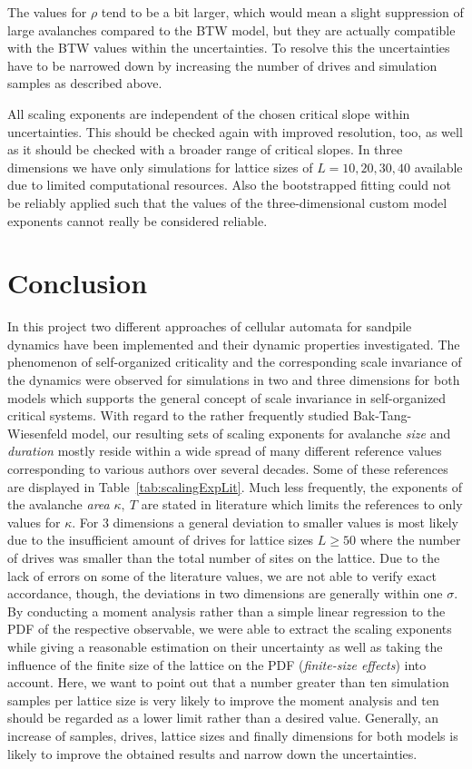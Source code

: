 The values for $\rho$ tend to be a bit larger, which would mean a slight suppression of large avalanches compared to
the BTW model, but they are actually compatible with the BTW values within the uncertainties. To resolve this the
uncertainties have to be narrowed down by increasing the number of drives and simulation samples as described above.

All scaling exponents are independent of the chosen critical slope within uncertainties. This should be checked again
with improved resolution, too, as well as it should be checked with a broader range of critical slopes.
In three dimensions we have only simulations for lattice sizes of $L=10,20,30,40$ available due to limited computational
resources. Also the bootstrapped fitting could not be reliably applied such that the values of the three-dimensional
custom model exponents cannot really be considered reliable.


\section{Conclusion}
\label{sec:conclusion}

In this project two different approaches of cellular automata for sandpile dynamics have been implemented and their
dynamic properties investigated. The phenomenon of self-organized criticality and the corresponding scale invariance
of the dynamics were observed for simulations in two and three dimensions for both models which supports the general
concept of scale invariance in self-organized critical systems. With regard to the rather frequently studied
Bak-Tang-Wiesenfeld model, our resulting sets of scaling exponents for avalanche \textit{size} and \textit{duration}
mostly reside within a wide spread of many different reference values corresponding to various authors over several
decades. Some of these references are displayed in Table~\ref{tab:scalingExpLit}. Much less frequently, the exponents of the
avalanche \textit{area} $\kappa,\ T$ are stated in literature which limits the references to only values for $\kappa$.
For 3 dimensions a general deviation to smaller values is most likely due to the insufficient amount of drives for
lattice sizes $L\ge 50$ where the number of drives was smaller than the total number of sites on the lattice.
Due to the lack of errors on some of the literature values, we are not able to verify exact accordance, though,
the deviations in two dimensions are generally within one $\sigma$. By conducting a moment analysis rather than a
simple linear regression to the PDF of the respective observable, we were able to extract the scaling exponents while
giving a reasonable estimation on their uncertainty as well as taking the influence of the finite size of the lattice
on the PDF (\textit{finite-size effects}) into account. Here, we want to point out that a number greater than ten
simulation samples per lattice size is very likely to improve the moment analysis and ten should be regarded as a lower
limit rather than a desired value. Generally, an increase of samples, drives, lattice sizes and finally dimensions for
both models is likely to improve the obtained results and narrow down the uncertainties.

